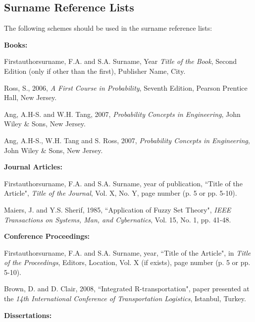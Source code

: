 \documentclass[a4paper,oneside,12pt]{report}
\numberwithin{equation}{chapter}
\begin{document}
\subsection{Surname Reference Lists}

The following schemes should be used in the surname reference lists:\newline


\leftskip 5mm \parindent -5mm \textbf{Books:}

\leftskip 5mm \parindent -5mm Firstauthorsurname, F.A. and S.A. Surname, Year \textit{Title of the Book}, Second Edition (only if other than the first), Publisher Name, City.

\leftskip 5mm \parindent -5mm Ross, S., 2006, \textit{A First Course in Probability}, Seventh Edition, Pearson Prentice Hall, New Jersey.

\leftskip 5mm \parindent -5mm Ang, A.H-S. and W.H. Tang, 2007, \textit{Probability Concepts in Engineering}, John Wiley \& Sons, New Jersey.

\leftskip 5mm \parindent -5mm Ang, A.H-S., W.H. Tang and S. Ross, 2007, \textit{Probability Concepts in Engineering}, John Wiley \& Sons, New Jersey.\newline


\leftskip 5mm \parindent -5mm \textbf{Journal Articles:}

\leftskip 5mm \parindent -5mm Firstauthorsurname, F.A. and S.A. Surname, year of publication, ``Title of the Article", \textit{Title of the Journal}, Vol. X, No. Y, page number (p. 5 or pp. 5-10).

\leftskip 5mm \parindent -5mm Maiers, J. and Y.S. Sherif, 1985, ``Application of Fuzzy Set Theory", \textit{IEEE Transactions on Systems, Man, and Cybernatics}, Vol. 15, No. 1, pp. 41-48.\newline

\clearpage
\leftskip 5mm \parindent -5mm \textbf{Conference Proceedings:}

\leftskip 5mm \parindent -5mm Firstauthorsurname, F.A. and S.A. Surname, year, ``Title of the Article", in \textit{Title of the Proceedings}, Editors, Location, Vol. X (if exists), page number (p. 5 or pp. 5-10).

\leftskip 5mm \parindent -5mm Brown, D. and D. Clair, 2008, ``Integrated R-transportation", paper presented at the \textit{14th International Conference of Transportation Logistics}, Istanbul, Turkey.\newline 


\leftskip 5mm \parindent -5mm \textbf{Dissertations:}
\end{document}
